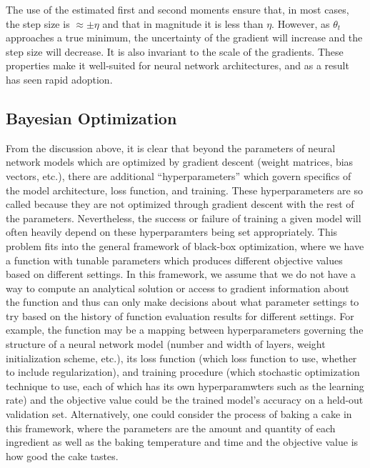The use of the estimated first and second moments ensure that, in most cases, the step size is $\approx \pm \eta$ and that in magnitude it is less than $\eta$.
However, as $\theta_t$ approaches a true minimum, the uncertainty of the gradient will increase and the step size will decrease.
It is also invariant to the scale of the gradients.
These properties make it well-suited for neural network architectures, and as a result has seen rapid adoption.

\subsection{Bayesian Optimization}

From the discussion above, it is clear that beyond the parameters of neural network models which are optimized by gradient descent (weight matrices, bias vectors, etc.), there are additional ``hyperparameters'' which govern specifics of the model architecture, loss function, and training.
These hyperparameters are so called because they are not optimized through gradient descent with the rest of the parameters.
Nevertheless, the success or failure of training a given model will often heavily depend on these hyperparamters being set appropriately.
This problem fits into the general framework of black-box optimization, where we have a function with tunable parameters which produces different objective values based on different settings.
In this framework, we assume that we do not have a way to compute an analytical solution or access to gradient information about the function and thus can only make decisions about what parameter settings to try based on the history of function evaluation results for different settings.
For example, the function may be a mapping between hyperparameters governing the structure of a neural network model (number and width of layers, weight initialization scheme, etc.), its loss function (which loss function to use, whether to include regularization), and training procedure (which stochastic optimization technique to use, each of which has its own hyperparamwters such as the learning rate) and the objective value could be the trained model's accuracy on a held-out validation set.
Alternatively, one could consider the process of baking a cake in this framework, where the parameters are the amount and quantity of each ingredient as well as the baking temperature and time and the objective value is how good the cake tastes.

